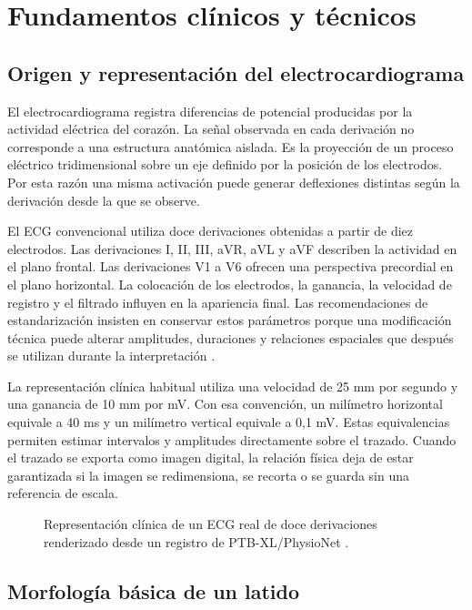 \chapter{Fundamentos clínicos y técnicos}
\label{chap:fundamentos}

\section{Origen y representación del electrocardiograma}

El electrocardiograma registra diferencias de potencial producidas por la actividad eléctrica del corazón. La señal observada en cada derivación no corresponde a una estructura anatómica aislada. Es la proyección de un proceso eléctrico tridimensional sobre un eje definido por la posición de los electrodos. Por esta razón una misma activación puede generar deflexiones distintas según la derivación desde la que se observe.

El ECG convencional utiliza doce derivaciones obtenidas a partir de diez electrodos. Las derivaciones I, II, III, aVR, aVL y aVF describen la actividad en el plano frontal. Las derivaciones V1 a V6 ofrecen una perspectiva precordial en el plano horizontal. La colocación de los electrodos, la ganancia, la velocidad de registro y el filtrado influyen en la apariencia final. Las recomendaciones de estandarización insisten en conservar estos parámetros porque una modificación técnica puede alterar amplitudes, duraciones y relaciones espaciales que después se utilizan durante la interpretación \cite{kligfield2007}.

La representación clínica habitual utiliza una velocidad de 25 mm por segundo y una ganancia de 10 mm por mV. Con esa convención, un milímetro horizontal equivale a 40 ms y un milímetro vertical equivale a 0,1 mV. Estas equivalencias permiten estimar intervalos y amplitudes directamente sobre el trazado. Cuando el trazado se exporta como imagen digital, la relación física deja de estar garantizada si la imagen se redimensiona, se recorta o se guarda sin una referencia de escala.

\begin{figure}[H]
  \centering
  \caption{Representación clínica de un ECG real de doce derivaciones renderizado desde un registro de PTB-XL/PhysioNet \cite{wagner2020}.}
  \label{fig:signal_to_image}
\end{figure}

\section{Morfología básica de un latido}

